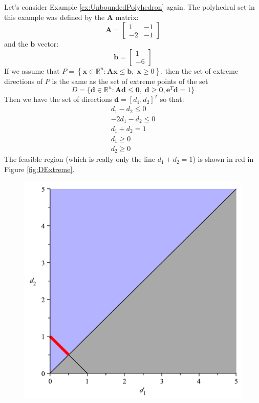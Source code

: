 \begin{example} Let's consider Example \ref{ex:UnboundedPolyhedron} again. The polyhedral set in this example was defined by the $\mathbf{A}$ matrix:
\begin{displaymath}
\mathbf{A} = \begin{bmatrix}
1 & -1\\
-2 & -1
\end{bmatrix}
\end{displaymath} 
and the $\mathbf{b}$ vector:
\begin{displaymath}
\mathbf{b} = \begin{bmatrix}
1 \\
-6
\end{bmatrix}
\end{displaymath}
If we assume that $P = \left\{\mathbf{x} \in \mathbb{R}^n : \mathbf{A} \mathbf{x} \leq \mathbf{b},\;\mathbf{x} \geq 0\right\}$, then the set of extreme directions of $P$ is the same as the set of extreme points of the set 
\begin{displaymath}
D = \{\mathbf{d} \in \mathbb{R}^n : \mathbf{A}\mathbf{d} \leq \mathbf{0},\;\mathbf{d} \geq \mathbf{0},\mathbf{e}^T\mathbf{d} = 1\}
\end{displaymath}
Then we have the set of directions $\mathbf{d} = [d_1,d_2]^T$ so that:
\begin{gather*}
d_1 - d_2 \leq 0\\
-2d_1 - d_2 \leq 0\\
d_1 + d_2 = 1\\
d_1 \geq 0\\
d_2 \geq 0
\end{gather*}
The feasible region (which is really only the line $d_1 + d_2 = 1$) is shown in red in Figure \ref{fig:DExtreme}.
\begin{figure}[htbp]
\centering
\includegraphics[scale=0.35]{DExtreme.pdf}

\end{figure}
\end{example}
